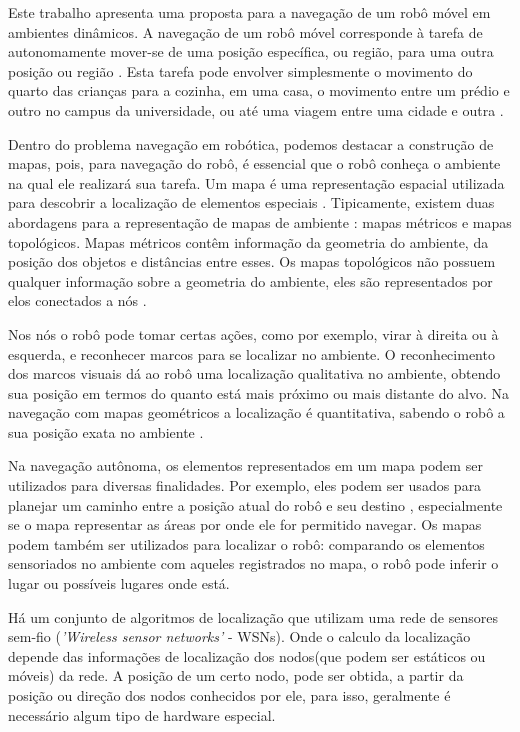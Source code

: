 \documentclass[12pt]{article}
\begin{document}
	Este trabalho apresenta uma proposta para a navegação de um robô móvel em ambientes dinâmicos. A navegação de um robô móvel corresponde à tarefa
de autonomamente mover-se de uma posição específica, ou região, para uma outra posição ou região \cite{construcaoMapas2}. Esta tarefa pode envolver simplesmente o 
movimento do quarto das crianças para a cozinha, em uma casa, o movimento entre um prédio e outro no
campus da universidade, ou até uma viagem entre uma cidade e outra \cite{construcaoMapas2}.
	
	Dentro do problema navegação em robótica, podemos destacar a construção de mapas, pois, para navegação do robô, 
é essencial que o robô conheça o ambiente na qual ele realizará sua tarefa. 
Um mapa é uma representação espacial utilizada para descobrir a localização de elementos especiais \cite{construcaoMapas2}.
Tipicamente, existem duas abordagens para a representação de mapas de ambiente \cite{construcaoMapas}:
 mapas métricos e mapas topológicos. Mapas métricos contêm informação da
 geometria do ambiente, da posição dos objetos e distâncias entre esses. Os mapas
topológicos não possuem qualquer informação sobre a geometria do ambiente, eles são
representados por elos conectados a nós \cite{construcaoMapas}. 

	Nos nós o robô pode tomar certas ações, como por
exemplo, virar à direita ou à esquerda, e reconhecer marcos para se localizar no ambiente. 
O reconhecimento dos marcos visuais dá ao robô uma localização qualitativa no ambiente,
obtendo sua posição em termos do quanto está mais próximo ou mais distante do alvo. Na
navegação com mapas geométricos a localização é quantitativa, sabendo o robô a sua posição
exata no ambiente \cite{construcaoMapas}.

	Na navegação autônoma, os elementos representados em um mapa podem ser utilizados para diversas finalidades. Por exemplo,
eles podem ser usados para planejar um caminho entre a posição atual do robô e seu
destino \cite{cnn}, especialmente se o mapa representar as áreas por onde ele for permitido navegar. Os mapas podem também ser
utilizados para localizar o robô: comparando os elementos sensoriados no ambiente com aqueles registrados no mapa, o robô pode
inferir o lugar ou possíveis lugares onde está.
	
	Há um conjunto de algoritmos de localização que utilizam uma rede de sensores sem-fio (\textit{'Wireless sensor networks'} - WSNs). Onde o 
	calculo da localização depende das informações de localização dos nodos(que podem ser estáticos ou móveis) da rede\cite{omc}.
	A posição de um certo nodo, pode ser obtida, a partir da posição ou direção dos nodos conhecidos por ele, para isso, geralmente 
	é necessário algum tipo de hardware especial. 
	
\end{document}
